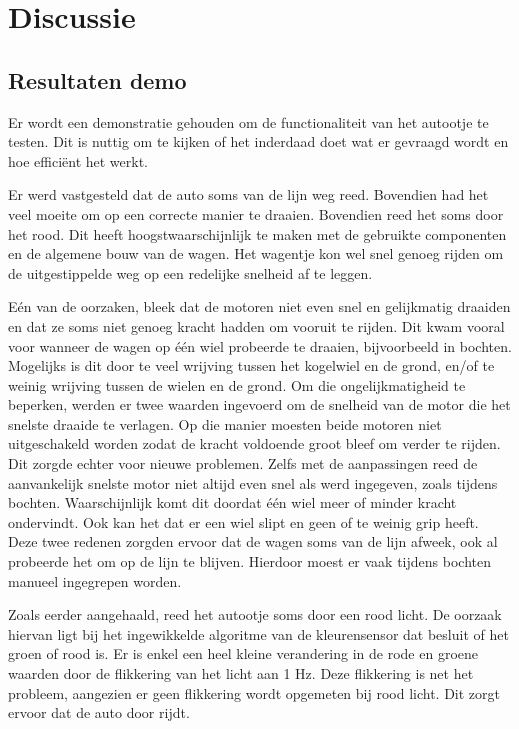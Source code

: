 \documentclass[a4paper,twoside,kulak]{kulakreport} %
\begin{document}
\section{Discussie} %
\subsection{Resultaten demo}  %
Er wordt een demonstratie gehouden om de functionaliteit van het autootje te testen. Dit is nuttig om te kijken of het inderdaad doet wat er gevraagd wordt en hoe efficiënt het werkt.

Er werd vastgesteld dat de auto soms van de lijn weg reed. Bovendien had het veel moeite om op een correcte manier te draaien. Bovendien reed het soms door het rood. Dit heeft hoogstwaarschijnlijk te maken met de gebruikte componenten en de algemene bouw van de wagen. Het wagentje kon wel snel genoeg rijden om de uitgestippelde weg op een redelijke snelheid af te leggen.

Eén van de oorzaken, bleek dat de motoren niet even snel en gelijkmatig draaiden en dat ze soms niet genoeg kracht hadden om vooruit te rijden. Dit kwam vooral voor wanneer de wagen op één wiel probeerde te draaien, bijvoorbeeld in bochten. Mogelijks is dit door te veel wrijving tussen het kogelwiel en de grond, en/of te weinig wrijving tussen de wielen en de grond. Om die ongelijkmatigheid te beperken, werden er twee waarden ingevoerd om de snelheid van de motor die het snelste draaide te verlagen. Op die manier moesten beide motoren niet uitgeschakeld worden zodat de kracht voldoende groot bleef om verder te rijden. Dit zorgde echter voor nieuwe problemen. Zelfs met de aanpassingen reed de aanvankelijk snelste motor niet altijd even snel als werd ingegeven, zoals tijdens bochten. Waarschijnlijk komt dit doordat één wiel meer of minder kracht ondervindt. Ook kan het dat er een wiel slipt en geen of te weinig grip heeft. Deze twee redenen zorgden ervoor dat de wagen soms van de lijn afweek, ook al probeerde het om op de lijn te blijven. Hierdoor moest er vaak tijdens bochten manueel ingegrepen worden.

Zoals eerder aangehaald, reed het autootje soms door een rood licht. De oorzaak hiervan ligt bij het ingewikkelde algoritme van de kleurensensor dat besluit of het groen of rood is. Er is enkel een heel kleine verandering in de rode en groene waarden door de flikkering van het licht aan 1 Hz. Deze flikkering is net het probleem, aangezien er geen flikkering wordt opgemeten bij rood licht. Dit zorgt ervoor dat de auto door rijdt.
\end{document}
